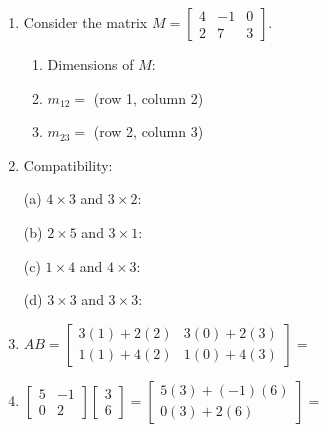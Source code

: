 \documentclass[10pt]{article}
\begin{document}
\namedateperiod

\vspace{0.12in}

\begin{enumerate}[leftmargin=1.6em, itemsep=14pt]

\item Consider the matrix $M = \begin{bmatrix}4 & -1 & 0 \\ 2 & 7 & 3\end{bmatrix}$.
\begin{enumerate}[label=(\alph*), itemsep=6pt]
  \item Dimensions of $M$: 
  \item $m_{12} = $  \quad (row 1, column 2)
  \item $m_{23} = $  \quad (row 2, column 3)
\end{enumerate}

\vspace{0.2in}

\item Compatibility:

\medskip
(a) $4\times 3$ and $3\times 2$: 

\smallskip
(b) $2\times 5$ and $3\times 1$: 

\smallskip
(c) $1\times 4$ and $4\times 3$: 

\smallskip
(d) $3\times 3$ and $3\times 3$: 

\vspace{0.2in}

\item $AB = \begin{bmatrix}3(1)+2(2) & 3(0)+2(3) \\ 1(1)+4(2) & 1(0)+4(3)\end{bmatrix}
= $ 

\vspace{0.2in}

\item $\begin{bmatrix}5 & -1 \\ 0 & 2\end{bmatrix}\begin{bmatrix}3 \\ 6\end{bmatrix}
= \begin{bmatrix}5(3)+(-1)(6) \\ 0(3)+2(6)\end{bmatrix}
= $ 


\end{enumerate}
\end{document}

